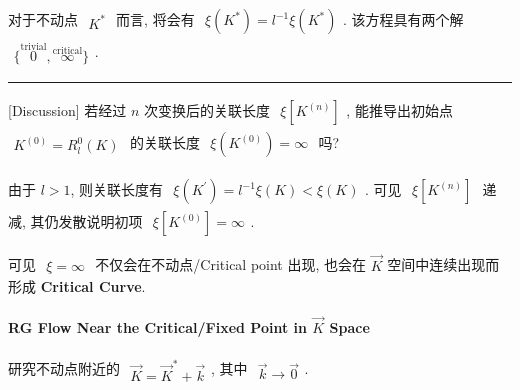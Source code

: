 \documentclass[../../main.tex]{subfiles}
\begin{document}
对于不动点 $\begin{aligned}
    K^{*}
\end{aligned}$ 而言, 将会有 $\begin{aligned}
    \xi(K^{*}) = l^{-1}\xi(K^{*})
\end{aligned}$. 该方程具有两个解 $\begin{aligned}
    \{\stackrel{\text{trivial}}{0},\stackrel{\text{critical}}{\infty}\}
\end{aligned}$. 

\vspace{0.5em}\hrule\vspace{0.5em}
[Discussion] 若经过 $n$ 次变换后的关联长度 $\begin{aligned}
    \xi\left[K^{(n)}\right]
\end{aligned}$, 能推导出初始点 $\begin{aligned}
    K^{(0)} =  R_{l}^{0}(K)
\end{aligned}$ 的关联长度 $\begin{aligned}
    \xi(K^{(0)}) = \infty
\end{aligned}$ 吗? 

由于 $l>1$, 则关联长度有 $\begin{aligned}
    \xi\left(K^{\prime}\right) = l^{-1}\xi(K)<\xi(K)
\end{aligned}$. 可见 $\begin{aligned}
    \xi\left[K^{(n)}\right]
\end{aligned}$ 递减, 其仍发散说明初项 $\begin{aligned}
    \xi\left[K^{(0)}\right] = \infty
\end{aligned}$. 

可见 $\begin{aligned}
    \xi = \infty
\end{aligned}$ 不仅会在不动点/Critical point 出现, 也会在 $\vec{K}$ 空间中连续出现而形成 \textbf{Critical Curve}.

\paragraph{RG Flow Near the Critical/Fixed Point in $\vec{K}$ Space}

研究不动点附近的 $\begin{aligned}
    \vec{K} = \vec{K}^{*} + \vec{k}
\end{aligned}$, 其中 $\begin{aligned}
    \vec{k}\rightarrow \vec{0}
\end{aligned}$. 
\end{document}
